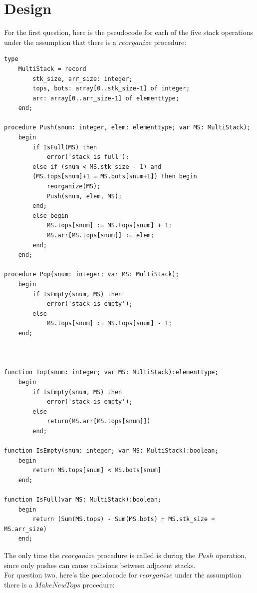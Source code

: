 \documentclass[12pt]{report}
\begin{document}
\chapter{Design}
\label{chapter:design}
For the first question, here is the pseudocode for each of the five stack operations
under the assumption that there is a $reorganize$ procedure:
\begin{verbatim}
type
    MultiStack = record
        stk_size, arr_size: integer;
        tops, bots: array[0..stk_size-1] of integer;
        arr: array[0..arr_size-1] of elementtype;
    end;

procedure Push(snum: integer, elem: elementtype; var MS: MultiStack);
    begin
        if IsFull(MS) then
            error('stack is full');
        else if (snum < MS.stk_size - 1) and 
        (MS.tops[snum]+1 = MS.bots[snum+1]) then begin
            reorganize(MS);
            Push(snum, elem, MS);
        end;
        else begin
            MS.tops[snum] := MS.tops[snum] + 1;
            MS.arr[MS.tops[snum]] := elem;
        end;
    end;

procedure Pop(snum: integer; var MS: MultiStack);
    begin
        if IsEmpty(snum, MS) then
            error('stack is empty');
        else
            MS.tops[snum] := MS.tops[snum] - 1;
    end;



function Top(snum: integer; var MS: MultiStack):elementtype;
    begin
        if IsEmpty(snum, MS) then
            error('stack is empty');
        else
            return(MS.arr[MS.tops[snum]])
        end;

function IsEmpty(snum: integer; var MS: MultiStack):boolean;
    begin
        return MS.tops[snum] < MS.bots[snum]
    end;

function IsFull(var MS: MultiStack):boolean;
    begin
        return (Sum(MS.tops) - Sum(MS.bots) + MS.stk_size = MS.arr_size)
    end;
\end{verbatim}
The only time the $reorganize$ procedure is called is during the $Push$ operation,
since only pushes can cause collisions between adjacent stacks.
\pagebreak
\\For question two, here's the pseudocode for $reorganize$
under the assumption there is a $MakeNewTops$ procedure:
\end{document}
